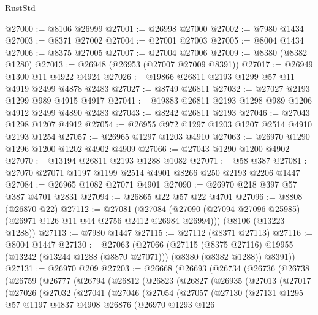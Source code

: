 \begin{lexlean}{RustStd}
\begin{coremodule}
@27000 := @8106 @26999
@27001 := @26998 @27000
@27002 := @7980 @1434
@27003 := @8371 @27002
@27004 := @27001 @27003
@27005 := @8004 @1434
@27006 := @8375 @27005
@27007 := @27004 @27006
@27009 := @8380 (@8382 @1280)
@27013 := @26948 (@26953 (@27007 @27009 @8391))
@27017 := @26949 @1300 @11 @4922 @4924
@27026 := @19866 @26811 @2193 @1299 @57 @11 @4919 @2499 @4878 @2483
@27027 := @8749 @26811
@27032 := @27027 @2193 @1299 @989 @4915 @4917
@27041 := @19883 @26811 @2193 @1298 @989 @1206 @4912 @2499 @4890 @2483
@27043 := @8242 @26811 @2193
@27046 := @27043 @1298 @1207 @4912
@27054 := @26955 @972 @1297 @1203 @1207 @2514 @4910 @2193 @1254
@27057 := @26965 @1297 @1203 @4910
@27063 := @26970 @1290 @1296 @1200 @1202 @4902 @4909
@27066 := @27043 @1290 @1200 @4902
@27070 := @13194 @26811 @2193 @1288 @1082
@27071 := @58 @387
@27081 := @27070 @27071 @1197 @1199 @2514 @4901 @8266 @250 @2193 @2206 @1447
@27084 := @26965 @1082 @27071 @4901
@27090 := @26970 @218 @397 @57 @387 @4701 @2831
@27094 := @26865 @22 @57 @22 @4701
@27096 := @8808 (@26870 @22)
@27112 := @27081
    (@27084 (@27090 (@27094 @27096 @25985) (@26971 @126 @11 @44 @2756 @2412 @26984 @26994)))
    (@8106 (@13223 @1288))
@27113 := @7980 @1447
@27115 := @27112 (@8371 @27113)
@27116 := @8004 @1447
@27130 := @27063
    (@27066
      (@27115
        (@8375 @27116)
        @19955
        (@13242 (@13244 @1288 (@8870 @27071)))
        (@8380 (@8382 @1288))
        @8391))
@27131 := @26970 @209
@27203 := @26668
    (@26693
      (@26734
        (@26736
          (@26738
            (@26759
              (@26777
                (@26794
                  (@26812
                    (@26823
                      (@26827
                        (@26935
                          (@27013
                            (@27017
                              (@27026
                                (@27032
                                  (@27041
                                    (@27046
                                      (@27054
                                        (@27057
                                          (@27130
                                            (@27131
                                              @1295
                                              @57
                                              @1197
                                              @4837
                                              @4908
                                              @26876
                                              (@26970
                                                @1293
                                                @126

\end{coremodule}
\end{lexlean}
